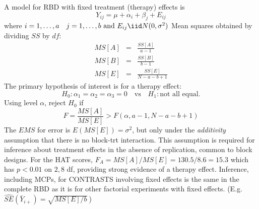 \newpage

\bigkn\noindent
A model for RBD with fixed treatment (therapy) effects is
$$ Y_{ij}=\mu+\alpha_i + \beta_j + E_{ij} $$
where $i=1,\ldots,a \ \ \ j=1,\ldots,b \mbox{ and }
E_{ij} \iid N(0,\sigma^2)$
\bigkn
Mean squares obtained by dividing $SS$ by $df$:
\begin{eqnarray*}
MS[A]&=&\frac{SS[A]}{a-1} \\
MS[B]&=&\frac{SS[B]}{b-1} \\
MS[E]&=&\frac{SS[E]}{N-a-b+1}
\end{eqnarray*}
\noindent 
The primary hypothesis of interest is for a therapy effect:
$$ H_0: \alpha_1 = \alpha_2 = \alpha_3 = 0 \ \ \ \mbox{ vs } \ \ \ H_1: \mbox{not all equal}.$$
Using level $\alpha$, reject $H_0$ if 
$$ F=\frac{MS[A]}{MS[E]} > F(\alpha,a-1,N-a-b+1)$$
\bigkn
The $EMS$ for error is $E(MS[E])=\sigma^2$, but only under the
{\em additivity} assumption that there is no block-trt interaction.
This assumption is required for inference about treatment effects
in the absence of replication, common to block designs. 
\bigkn
For the HAT scores, $F_A=MS[A]/MS[E]=130.5/8.6=15.3$ which has $p<0.01$
on $2,8$ df, providing strong evidence of a therapy effect.  Inference,
including MCPs,
for CONTRASTS involving fixed effects is the same in the complete RBD 
as it is for other factorial experiments with fixed effects.
(E.g. $\widehat{SE}(\bar{Y}_{i+}) = \sqrt{MS[E]/b}\ $)
\newpage


